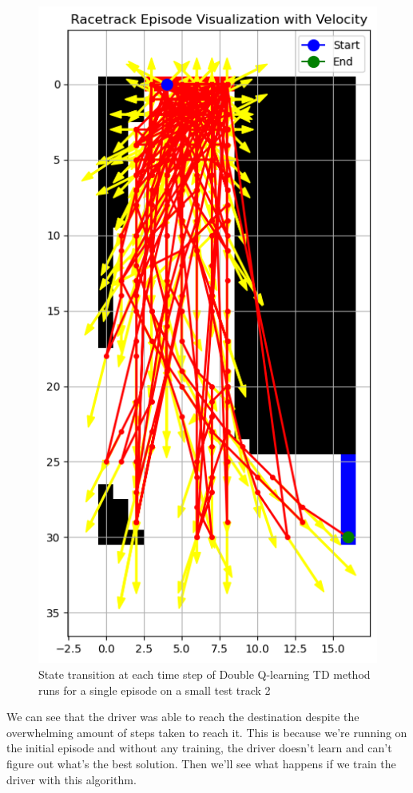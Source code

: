 \documentclass{article}
\begin{document}
\begin{figure}[h!]
\centering
\includegraphics[scale=0.5]{./images/q-td-learning-test-track2.png}
\caption{State transition at each time step of Double Q-learning TD method runs for a single episode on a
small test track 2}
\label{fig:q-td-learning-test-track2}
\end{figure}

We can see that the driver was able to reach the destination despite the
overwhelming amount of steps taken to reach it. This is because we're running on
the initial episode and without any training, the driver doesn't learn and can't
figure out what's the best solution. Then we'll see what happens if we train the
driver with this algorithm.
\end{document}
